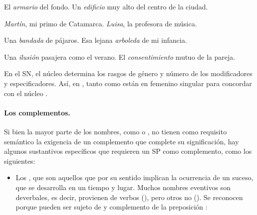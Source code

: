 \begin{exe}
  \ex\label{ex:05-armario}
    \begin{xlist}
      \ex El \textit{armario} del fondo.
      \ex Un \textit{edificio} muy alto del centro de la ciudad.
    \end{xlist}
  \ex\label{ex:05-martin}
    \begin{xlist}
      \ex \textit{Martín}, mi primo de Catamarca.
      \ex \textit{Luisa}, la profesora de música.
    \end{xlist}
  \ex\label{ex:05-bandada}
    \begin{xlist}
      \ex Una \textit{bandada} de pájaros.
      \ex\label{ex:05-arboleda} Esa lejana \textit{arboleda} de mi infancia.
    \end{xlist}
  \ex\label{ex:05-ilusion}
    \begin{xlist}
      \ex Una \textit{ilusión} pasajera como el verano.
      \ex El \textit{consentimiento} mutuo de la pareja.
    \end{xlist}
\end{exe}

En el SN, el núcleo determina los rasgos de género y número de los modificadores
y especificadores. Así, en , tanto  como
 están en femenino singular para concordar con el núcleo
.

\paragraph{Los complementos.} Si bien la mayor parte de los nombres, como
 o , no tienen como requisito semántico la exigencia
de un complemento que complete su significación, hay algunos sustantivos
específicos que requieren un SP como complemento, como los siguientes:

\begin{itemize}
  \item Los , que son aquellos que por su sentido
        implican la ocurrencia de un suceso, que se desarrolla en un tiempo y
        lugar. Muchos nombres eventivos son deverbales, es decir, provienen de
        verbos (), pero otros no
        (). Se reconocen porque pueden ser
        sujeto de   y complemento de la
        preposición  :
\end{itemize}

